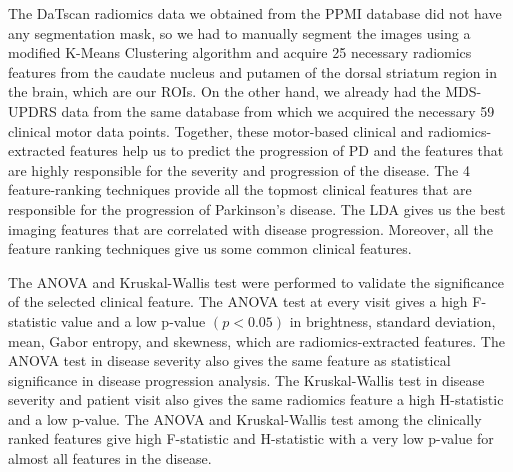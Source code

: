 \documentclass{article}
\begin{document}
The DaTscan radiomics data we obtained from the PPMI database did not have any segmentation mask, so we had to manually segment the images using a modified K-Means Clustering algorithm and acquire 25 necessary radiomics features from the caudate nucleus and putamen of the dorsal striatum region in the brain, which are our ROIs. On the other hand, we already had the MDS-UPDRS data from the same database from which we acquired the necessary 59 clinical motor data points. Together, these motor-based clinical and radiomics-extracted features help us to predict the progression of PD and the features that are highly responsible for the severity and progression of the disease. The 4 feature-ranking techniques provide all the topmost clinical features that are responsible for the progression of Parkinson's disease. The LDA gives us the best imaging features that are correlated with disease progression. Moreover, all the feature ranking techniques give us some common clinical features. 

The ANOVA and Kruskal-Wallis test were performed to validate the significance of the selected clinical feature. The ANOVA test at every visit gives a high F-statistic value and a low p-value $(p < 0.05)$ in brightness, standard deviation, mean, Gabor entropy, and skewness, which are radiomics-extracted features. The ANOVA test in disease severity also gives the same feature as statistical significance in disease progression analysis. The Kruskal-Wallis test in disease severity and patient visit also gives the same radiomics feature a high H-statistic and a low p-value. The ANOVA and Kruskal-Wallis test among the clinically ranked features give high F-statistic and H-statistic with a very low p-value for almost all features in the disease. 
\end{document}
